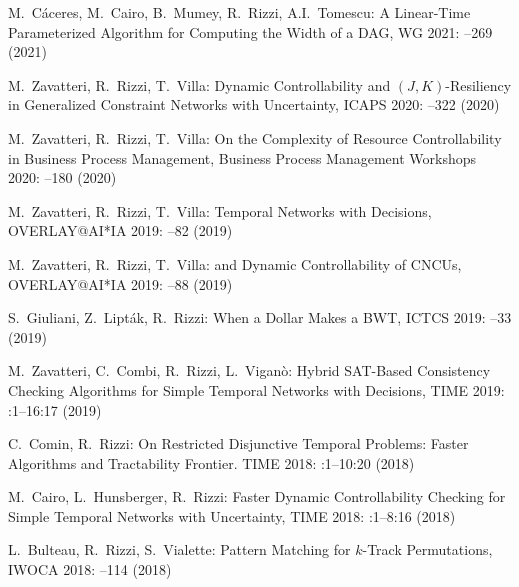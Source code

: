 \begin{etaremune}
\item {\sc M.~Cáceres, M.~Cairo, B.~Mumey, R.~Rizzi, A.I.~Tomescu:}
   \newblock A Linear-Time Parameterized Algorithm for Computing the Width of a DAG,
   \newblock WG 2021:
   --269 (2021)
   
\item {\sc M.~Zavatteri, R.~Rizzi, T.~Villa:}
   \newblock Dynamic Controllability and $(J,K)$-Resiliency in Generalized Constraint Networks with Uncertainty,
   \newblock  ICAPS 2020:
   --322 (2020)
   
\item {\sc M.~Zavatteri, R.~Rizzi, T.~Villa:}
   \newblock On the Complexity of Resource Controllability in Business Process Management,
   \newblock  Business Process Management Workshops 2020:
   --180 (2020)
   
\item {\sc M.~Zavatteri, R.~Rizzi, T.~Villa:}
   \newblock Temporal Networks with Decisions,
   \newblock  OVERLAY@AI*IA 2019:
   --82 (2019)
   
\item {\sc M.~Zavatteri, R.~Rizzi, T.~Villa:}
   \newblock  and Dynamic Controllability of CNCUs,
   \newblock  OVERLAY@AI*IA 2019:
   --88 (2019)
   
 \item {\sc S.~Giuliani, Z.~Lipták, R.~Rizzi:}
   \newblock  When a Dollar Makes a BWT,
   \newblock  ICTCS 2019:
   --33 (2019)
  
\item {\sc M.~Zavatteri, C.~Combi, R.~Rizzi, L.~Viganò:}
   \newblock Hybrid SAT-Based Consistency Checking Algorithms for Simple Temporal Networks with Decisions,
   \newblock  TIME 2019:
   :1--16:17 (2019)
  
  \item {\sc C.~Comin, R.~Rizzi:}
   \newblock On Restricted Disjunctive Temporal Problems: Faster Algorithms and Tractability Frontier.
   \newblock TIME 2018:
   :1--10:20 (2018)
  
  \item {\sc M.~Cairo, L.~Hunsberger, R.~Rizzi:}
   \newblock Faster Dynamic Controllability Checking for Simple Temporal Networks with Uncertainty,
   \newblock TIME 2018:
   :1--8:16 (2018)
   
  \item {\sc L.~Bulteau, R.~Rizzi, S.~Vialette:}
   \newblock Pattern Matching for $k$-Track Permutations,
   \newblock IWOCA 2018:
   --114 (2018)


\end{etaremune}
